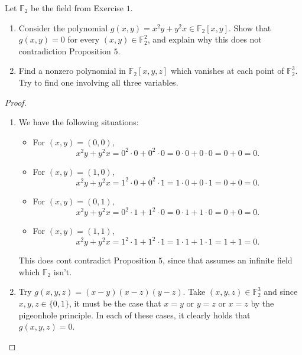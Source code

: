 \begin{exercise}{2}
Let $\mathbb{F}_2$ be the field from Exercise $1$.
\begin{enumerate}
    \item Consider the polynomial $g(x,y) = x^2 y + y^2 x\in \mathbb{F}_2[x,y]$. Show that $g(x,y) = 0$ for every $(x,y)\in \mathbb{F}_2^2$, and explain why this does not contradiction Proposition $5$.
    \item Find a nonzero polynomial in $\mathbb{F}_2[x,y,z]$ which vanishes at each point of $\mathbb{F}_2^3$. Try to find one involving all three variables.
\end{enumerate}
\end{exercise}
\begin{proof}
\begin{enumerate}
    \item We have the following situations:
    \begin{itemize}
        \item For $(x,y) = (0,0)$,
        $$x^2 y + y^2 x = 0^2\cdot 0 + 0^2 \cdot 0 = 0\cdot 0 + 0\cdot 0 = 0 + 0 = 0.$$
        \item For $(x,y) = (1,0)$,
        $$x^2 y + y^2 x = 1^2\cdot 0 + 0^2 \cdot 1 = 1\cdot 0 + 0\cdot 1 = 0 + 0 = 0.$$
        \item For $(x,y) = (0,1)$,
        $$x^2 y + y^2 x = 0^2\cdot 1 + 1^2 \cdot 0 = 0\cdot 1 + 1\cdot 0 = 0 + 0 = 0.$$
        \item For $(x,y) = (1,1)$,
        $$x^2 y + y^2 x = 1^2\cdot 1 + 1^2 \cdot 1 = 1\cdot 1 + 1\cdot 1 = 1 + 1 = 0.$$
    \end{itemize}
    This does cont contradict Proposition $5$, since that assumes an infinite field which $\mathbb{F}_2$ isn't.
    \item Try $g(x,y,z) = (x-y)(x-z)(y-z)$. Take $(x,y,z)\in \mathbb{F}_2^3$ and since $x,y,z\in \{0,1\}$, it must be the case that $x=y$ or $y=z$ or $x=z$ by the pigeonhole principle. In each of these cases, it clearly holds that $g(x,y,z) = 0$.
\end{enumerate}    
\end{proof}



